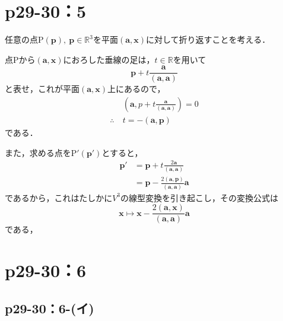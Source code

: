 \documentclass[a4paper,10pt,fleqn]{ltjsarticle}
\begin{document}
\section*{p29-30：5}

\begin{tleftbar}
    任意の点$\mathrm{P}(\bm{p}),~\bm{p} \in \mathbb{R}^3$を平面$(\bm{a},\bm{x})$に対して折り返すことを考える．

    点$\mathrm{P}$から$(\bm{a},\bm{x})$におろした垂線の足は，$t \in \mathbb{R}$を用いて
    \[
        \bm{p} + t \frac{\bm{a}}{(\bm{a},\bm{a})}
    \]
    と表せ，これが平面$(\bm{a},\bm{x})$上にあるので，
    \begin{align*}
                     & (\bm{a},p+t\frac{\bm{a}}{(\bm{a},\bm{a})})=0 \\
        \therefore ~ & t=- (\bm{a},\bm{p})
    \end{align*}
    である．

    また，求める点を$\mathrm{P}' (\bm{p}')$とすると，
    \begin{align*}
        \bm{p}' & = \bm{p}+t \frac{2\bm{a}}{(\bm{a},\bm{a})}               \\
                & = \bm{p}-\frac{2(\bm{a},\bm{p})}{(\bm{a},\bm{a})} \bm{a}
    \end{align*}
    であるから，これはたしかに$V^3$の線型変換を引き起こし，その変換公式は
    \[
        \bm{x} \mapsto \bm{x}-\frac{2(\bm{a},\bm{x})}{(\bm{a},\bm{a})} \bm{a}
    \]
    である，
\end{tleftbar}

\newpage

\section*{p29-30：6}

\subsection*{p29-30：6-(イ)}
\end{document}
